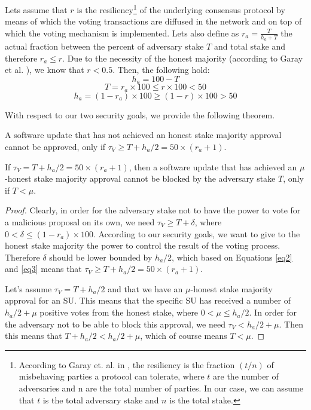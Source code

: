 Lets assume that $r$ is the resiliency\footnote{According to Garay et. al. in \cite{sok}, the resiliency is the fraction $(t/n)$ of misbehaving parties a protocol can tolerate, where $t$ are the number of adversaries and n are the total number of parties. In our case, we can assume that $t$ is the total adversary stake and $n$ is the total stake.} of the underlying consensus protocol by means of which the voting transactions are diffused in the network and on top of which the voting mechanism is implemented. Lets also define as $r_a = \frac{T}{h_a+T}$ the actual fraction between the percent of adversary stake $T$ and total stake and therefore $r_a \leq r$. Due to the necessity of the honest majority (according to Garay et al. \cite{sok}), we know that $r < 0.5$. Then, 
 the following hold:
\begin{equation} \label{eq1}
h_a = 100 -T
\end{equation}
\begin{equation} \label{eq2}
T = r_a \times 100 \leq r \times 100 < 50
\end{equation}
\begin{equation} \label{eq3}
h_a = (1-r_a) \times 100 \geq (1-r)\times 100 > 50
\end{equation}

With respect to our two security goals, we provide the following theorem.

\begin{theorem}
A software update that has not achieved an honest stake majority approval cannot be approved, only if $\tau_V \geq T + h_a/2 =  50 \times (r_a + 1)$.

If $\tau_V = T + h_a/2 =  50 \times (r_a + 1)$, then a software update that has achieved an $\mu$-honest stake majority approval cannot be blocked by the adversary stake $T$, only if $T < \mu$.
\end{theorem}
\begin{proof}
Clearly, in order for the adversary stake not to have the power to vote for a malicious proposal on its own, we need $\tau_V \geq T + \delta$, where $0 < \delta \leq (1-r_a) \times 100$. According to our security goals, we want to give to the honest stake majority the power to control the result of the voting process. Therefore $\delta$ should be lower bounded by $h_a/2$, which based on Equations \ref{eq2} and \ref{eq3} means that $\tau_V \geq T + h_a/2 =  50 \times (r_a + 1)$.

Let's assume $\tau_V = T + h_a/2$ and that we have an $\mu$-honest stake majority approval for an SU. This means that the specific SU has received a number of $h_a/2 + \mu$ positive votes from the honest stake, where $0 < \mu \leq h_a/2$. In order for the adversary not to be able to block this approval, we need $\tau_V < h_a/2 +\mu$. Then this means that $T + h_a/2 < h_a/2 + \mu$, which of course means $T < \mu$. 
\end{proof}

